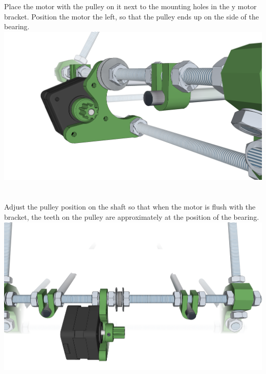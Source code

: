 \documentclass[twoside,a4paper,titlepage]{memoir}
\begin{document}
	\section{}
	Place the motor with the pulley on it next to the mounting holes in the y motor bracket. Position the
	motor the left, so that the pulley ends up on the side of the bearing.\\
	\includegraphics[width=1\linewidth]{graphics/ch6_16.png}
	
	\section{}
	Adjust the pulley position on the shaft so that when the motor is flush with the bracket, the teeth on the
	pulley are approximately at the position of the bearing.\\
	\includegraphics[width=1\linewidth]{graphics/ch6_17.png}
	
\end{document}
